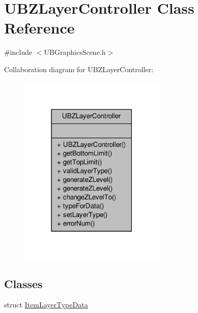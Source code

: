\hypertarget{class_u_b_z_layer_controller}{\section{U\-B\-Z\-Layer\-Controller Class Reference}
\label{d7/dd6/class_u_b_z_layer_controller}
}


{\ttfamily \#include $<$U\-B\-Graphics\-Scene.\-h$>$}



Collaboration diagram for U\-B\-Z\-Layer\-Controller\-:
\nopagebreak
\begin{figure}[H]
\begin{center}
\leavevmode
\includegraphics[width=198pt]{d8/d93/class_u_b_z_layer_controller__coll__graph}
\end{center}
\end{figure}
\subsection*{Classes}
\begin{DoxyCompactItemize}
\item 
struct \hyperlink{struct_u_b_z_layer_controller_1_1_item_layer_type_data}{Item\-Layer\-Type\-Data}
\end{DoxyCompactItemize}
